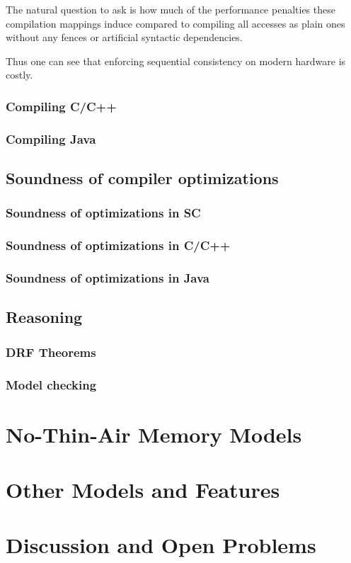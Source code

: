 \documentclass[a4paper,twoside,11pt]{article}
\numberwithin{equation}{section}
\begin{document}

The natural question to ask is how much of the performance penalties
these compilation mappings induce compared to compiling all accesses as plain ones
without any fences or artificial syntactic dependencies.


Thus one can see that enforcing sequential consistency on modern hardware is costly.

\subsubsection{Compiling C/C++}

\subsubsection{Compiling Java}


\subsection{Soundness of compiler optimizations}

\subsubsection{Soundness of optimizations in SC}

\subsubsection{Soundness of optimizations in C/C++}

\subsubsection{Soundness of optimizations in Java}

\subsection{Reasoning}

\subsubsection{DRF Theorems}

\subsubsection{Model checking}

\section{No-Thin-Air Memory Models}

\section{Other Models and Features}



\section{Discussion and Open Problems}

 

\end{document}
